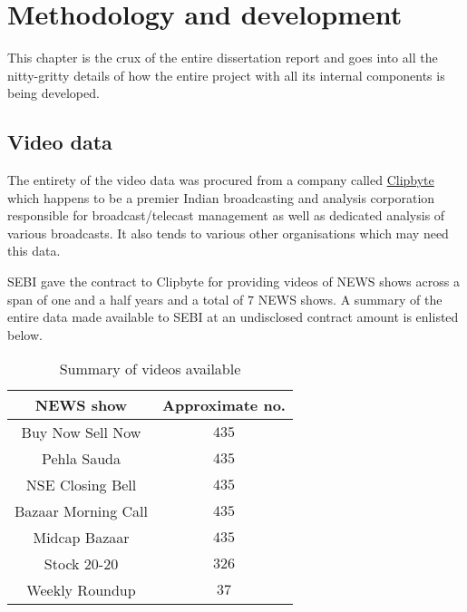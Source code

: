 \chapter{Methodology and development} \label{chapter3}

This chapter is the crux of the entire dissertation report and goes into all the nitty-gritty details of how the entire project with all its internal components is being developed.

\vspace{-0.1in}
\section{Video data} \label{vid_data}

The entirety of the video data was procured from a company called \href{clipbyte.com}{Clipbyte} which happens to be a premier Indian broadcasting and analysis corporation responsible for broadcast/telecast management as well as dedicated analysis of various broadcasts. It also tends to various other organisations which may need this data. \par

SEBI gave the contract to Clipbyte for providing videos of NEWS shows across a span of one and a half years and a total of $7$ NEWS shows. A summary of the entire data made available to SEBI at an undisclosed contract amount is enlisted below.

\begin{table}[h]
 \def\arraystretch{1.5}
 \centering
 \caption{Summary of videos available}
 \begin{tabular}{|c|c|}
  \hline
  NEWS show & Approximate no.\\
  \hline
  Buy Now Sell Now & $435$                   \\
  \hline
  Pehla Sauda & $435$                   \\
  \hline
  NSE Closing Bell & $435$                   \\
  \hline
  Bazaar Morning Call & $435$                   \\
  \hline
  Midcap Bazaar & $435$                 \\
  \hline
  Stock 20-20 & $326$                \\
  \hline
  Weekly Roundup & $37$              \\
  \hline
 \end{tabular}
 \label{tab:news_shows_acquired}
\end{table}

